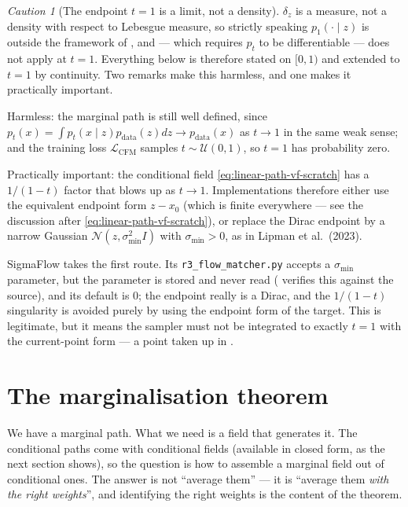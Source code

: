 \documentclass[11pt,a4paper]{report}
\theoremstyle{definition}
\theoremstyle{remark}
\newtheorem{caution}[caution]{Caution}
\newcommand{\file}[1]{\texttt{#1}}
\begin{document}
\begin{caution}[The endpoint $t=1$ is a limit, not a density]
\label{caution:dirac-endpoint}
$\delta_z$ is a measure, not a density with respect to Lebesgue measure, so
strictly speaking $p_1(\cdot\mid z)$ is outside the framework of
, and  --- which requires $p_t$ to be
differentiable --- does not apply at $t=1$. Everything below is therefore
stated on $[0,1)$ and extended to $t=1$ by continuity. Two remarks make this
harmless, and one makes it practically important.

Harmless: the marginal path is still well defined, since
$p_t(x)=\int p_t(x\mid z)p_{\mathrm{data}}(z)dz\to p_{\mathrm{data}}(x)$ as
$t\to1$ in the same weak sense; and the training loss
$\mathcal L_{\mathrm{CFM}}$ samples $t\sim\mathcal U(0,1)$, so $t=1$ has
probability zero.

Practically important: the conditional field
\eqref{eq:linear-path-vf-scratch} has a $1/(1-t)$ factor that blows up as
$t\to1$. Implementations therefore either use the equivalent
endpoint form $z-x_0$ (which is finite everywhere --- see the discussion
after \eqref{eq:linear-path-vf-scratch}), or replace the Dirac endpoint by a
narrow Gaussian $\mathcal N(z,\sigma_{\min}^2I)$ with $\sigma_{\min}>0$, as
in Lipman et al.\ (2023).

SigmaFlow takes the first route. Its \file{r3\_flow\_matcher.py} accepts a
$\sigma_{\min}$ parameter, but the parameter is stored and never read
( verifies this against the source), and its
default is $0$; the endpoint really is a Dirac, and the $1/(1-t)$ singularity
is avoided purely by using the endpoint form of the target. This is
legitimate, but it means the sampler must not be integrated to exactly
$t=1$ with the current-point form --- a point taken up in
.
\end{caution}

\section{The marginalisation theorem}
\label{sec:marginalisation}

We have a marginal path. What we need is a field that generates it. The
conditional paths come with conditional fields (available in closed form,
as the next section shows), so the question is how to assemble a marginal
field out of conditional ones. The answer is not ``average them'' --- it is
``average them \emph{with the right weights}'', and identifying the right
weights is the content of the theorem.
\end{document}
